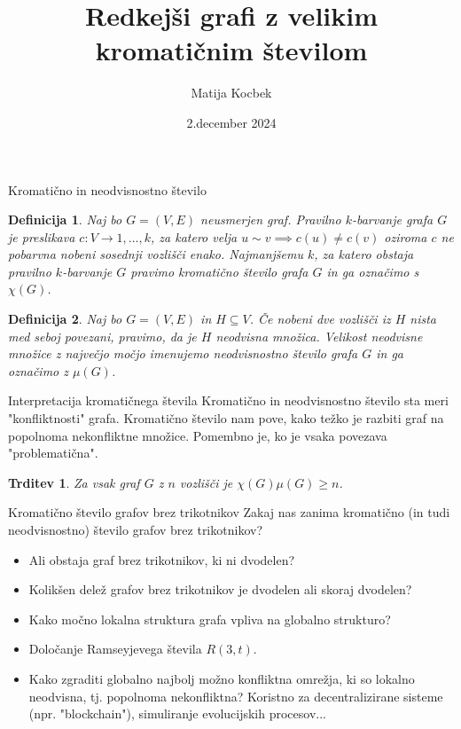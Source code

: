 \documentclass[t]{beamer} %
\title{Redkejši grafi z velikim kromatičnim številom}
\author{Matija Kocbek}
\institute{mentor: prof.~dr.~Riste Škrekovski}
\date{2.\;december 2024}
\newtheorem{definicija}{Definicija}
\newtheorem{trditev}{Trditev}
\newcommand{\fillblack}[1]{
\begin{tikzpicture}[remember picture, overlay]
    \node [shift={(0 cm,0cm)}]  at (current page.south west)
        {%
        \begin{tikzpicture}[remember picture, overlay] at (current page.south west)
            \draw [fill=black] (0, 0) -- (0,#1 \paperheight) --
                              (\paperwidth,#1 \paperheight) -- (\paperwidth,0) -- cycle ;
        \end{tikzpicture}
        };
        \draw (current page.north west) rectangle (current page.south east);
\end{tikzpicture}
}
\begin{document}
\begin{frame}
  \maketitle
\end{frame}

\begin{frame}[fragile]{Kromatično in neodvisnostno število}
  \begin{definicija}
    Naj bo $G = (V, E)$ neusmerjen graf. Pravilno $k$-barvanje grafa $G$ je preslikava $c: V \to {1, \ldots, k}$, za katero velja $u \sim v \implies c(u) \neq c(v)$
    oziroma $c$ ne pobarvna nobeni sosednji vozlišči enako. Najmanjšemu $k$, za katero obstaja pravilno $k$-barvanje $G$ pravimo kromatično število grafa $G$ in ga
    označimo s $\chi(G)$.
  \end{definicija}
  \pause
  \begin{definicija}
    Naj bo $G = (V, E)$ in $H \subseteq V$. Če nobeni dve vozlišči iz $H$ nista med seboj povezani, pravimo, da je $H$ neodvisna množica. Velikost neodvisne množice
    z največjo močjo imenujemo neodvisnostno število grafa $G$ in ga označimo z $\mu(G)$.
  \end{definicija}
\end{frame}

\begin{frame}[fragile]{Interpretacija kromatičnega števila}
  Kromatično in neodvisnostno število sta meri "konfliktnosti" grafa. Kromatično število nam pove, kako težko je razbiti graf na popolnoma nekonfliktne množice.
  Pomembno je, ko je vsaka povezava "problematična".
  \pause
  \begin{trditev}
    Za vsak graf $G$ z $n$ vozlišči je $\chi(G)\mu(G) \geq n$.
  \end{trditev}
\end{frame}

\begin{frame}[fragile]{Kromatično število grafov brez trikotnikov}
  Zakaj nas zanima kromatično (in tudi neodvisnostno) število grafov brez trikotnikov?
  \pause
  \begin{itemize}
    \item Ali obstaja graf brez trikotnikov, ki ni dvodelen? \pause
    \item Kolikšen delež grafov brez trikotnikov je dvodelen ali skoraj dvodelen? \pause
    \item Kako močno lokalna struktura grafa vpliva na globalno strukturo? \pause
    \item Določanje Ramseyjevega števila $R(3,t)$. \pause
    \item Kako zgraditi globalno najbolj možno konfliktna omrežja, ki so lokalno neodvisna, tj. popolnoma nekonfliktna? Koristno za decentralizirane sisteme (npr. "blockchain"),
          simuliranje evolucijskih procesov...
  \end{itemize}
\end{frame}
\end{document}
